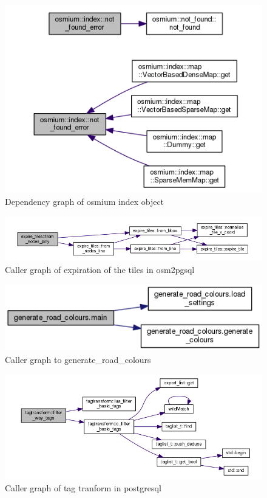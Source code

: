 \begin{figure}
	\centering
	\includegraphics[scale=.8]{input/images/dep_osmium_index.png}
	\caption{Dependency graph of osmium index object}
	\label{fig:comment1}
\end{figure}

\begin{figure}
\centering
\includegraphics[width=1\linewidth]{input/images/dep_expire_tiles.png}
\caption{Caller graph of expiration of the tiles in osm2pgsql}
\label{fig:comment}
\end{figure}
\begin{figure}
\centering
\includegraphics[scale=0.8]{input/images/dep_road.png}
\caption{Caller graph to generate\_road\_colours}
\label{fig:dependency}
\end{figure}


\begin{figure}
\centering
\includegraphics[scale=0.6]{input/images/dep_tagtransform.png}
\caption{Caller graph of tag tranform in postgresql}
\label{fig:dependencyy}
\end{figure}


